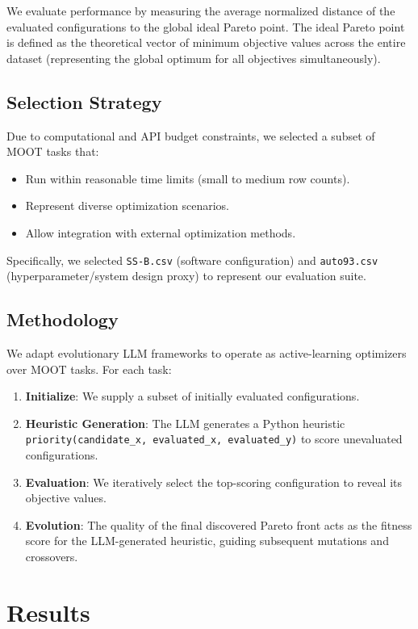 \documentclass[sigconf,nonacm]{acmart}
\begin{document}
We evaluate performance by measuring the average normalized distance of the evaluated configurations to the global ideal Pareto point. The ideal Pareto point is defined as the theoretical vector of minimum objective values across the entire dataset (representing the global optimum for all objectives simultaneously).

\subsection{Selection Strategy}

Due to computational and API budget constraints, we selected a subset of MOOT tasks that:
\begin{itemize}
\item Run within reasonable time limits (small to medium row counts).
\item Represent diverse optimization scenarios.
\item Allow integration with external optimization methods.
\end{itemize}
Specifically, we selected \texttt{SS-B.csv} (software configuration) and \texttt{auto93.csv} (hyperparameter/system design proxy) to represent our evaluation suite. 

\subsection{Methodology}

We adapt evolutionary LLM frameworks to operate as active-learning optimizers over MOOT tasks. For each task:
\begin{enumerate}
\item \textbf{Initialize}: We supply a subset of initially evaluated configurations.
\item \textbf{Heuristic Generation}: The LLM generates a Python heuristic \texttt{priority(candidate\_x, evaluated\_x, evaluated\_y)} to score unevaluated configurations.
\item \textbf{Evaluation}: We iteratively select the top-scoring configuration to reveal its objective values.
\item \textbf{Evolution}: The quality of the final discovered Pareto front acts as the fitness score for the LLM-generated heuristic, guiding subsequent mutations and crossovers.
\end{enumerate}

\section{Results}
\end{document}
